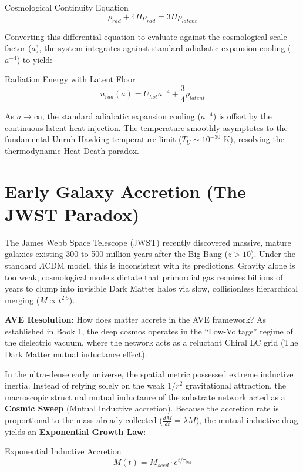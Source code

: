 \begin{resultbox}{Cosmological Continuity Equation}
\begin{equation}
\dot{\rho}_{rad} + 4H\rho_{rad} = 3H\rho_{latent}
\end{equation}
\end{resultbox}

Converting this differential equation to evaluate against the cosmological scale factor ($a$), the system integrates against standard adiabatic expansion cooling ($a^{-4}$) to yield:

\begin{resultbox}{Radiation Energy with Latent Floor}
\begin{equation}
u_{rad}(a) = U_{hot}a^{-4} + \frac{3}{4}\rho_{latent}
\end{equation}
\end{resultbox}

As $a \to \infty$, the standard adiabatic expansion cooling ($a^{-4}$) is offset by the continuous latent heat injection. The temperature smoothly asymptotes to the fundamental Unruh-Hawking temperature limit ($T_U \sim 10^{-30}\text{ K}$), resolving the thermodynamic Heat Death paradox.

\section{Early Galaxy Accretion (The JWST Paradox)}
The James Webb Space Telescope (JWST) recently discovered massive, mature galaxies existing 300 to 500 million years after the Big Bang ($z > 10$). Under the standard $\Lambda$CDM model, this is inconsistent with its predictions. Gravity alone is too weak; cosmological models dictate that primordial gas requires billions of years to clump into invisible Dark Matter halos via slow, collisionless hierarchical merging ($M \propto t^{2.5}$).

\textbf{AVE Resolution:} How does matter accrete in the AVE framework? As established in Book 1, the deep cosmos operates in the ``Low-Voltage'' regime of the dielectric vacuum, where the network acts as a reluctant Chiral LC grid (The Dark Matter mutual inductance effect). 

In the ultra-dense early universe, the spatial metric possessed extreme inductive inertia. Instead of relying solely on the weak $1/r^2$ gravitational attraction, the macroscopic structural mutual inductance of the substrate network acted as a \textbf{Cosmic Sweep} (Mutual Inductive accretion). Because the accretion rate is proportional to the mass already collected ($\frac{dM}{dt} = \lambda M$), the mutual inductive drag yields an \textbf{Exponential Growth Law}:
\begin{resultbox}{Exponential Inductive Accretion}
\begin{equation}
    M(t) = M_{seed} \cdot e^{t / \tau_{ind}}
\end{equation}
\end{resultbox}

